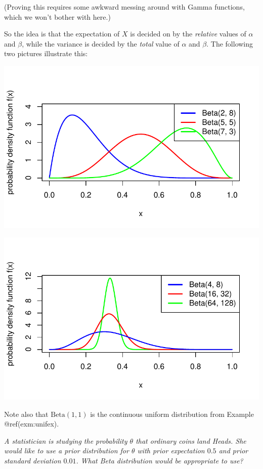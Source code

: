 \documentclass[
  letterpaper,
]{report}
\theoremstyle{definition}
\theoremstyle{definition}
\theoremstyle{remark}
\begin{document}
(Proving this requires some awkward messing around with Gamma functions,
which we won't bother with here.)

So the idea is that the expectation of \(X\) is decided on by the
\emph{relative} values of \(\alpha\) and \(\beta\), while the variance
is decided by the \emph{total} value of \(\alpha\) and \(\beta\). The
following two pictures illustrate this:

\includegraphics{sections/L20-bayes-models_files/figure-pdf/beta-pic-1-1.pdf}

\includegraphics{sections/L20-bayes-models_files/figure-pdf/beta-pic-2-1.pdf}

Note also that \(\text{Beta}(1,1)\) is the continuous uniform
distribution from Example @ref(exm:unifex).

\emph{A statistician is studying the probability \(\theta\) that
ordinary coins land Heads. She would like to use a prior distribution
for \(\theta\) with prior expectation \(0.5\) and prior standard
deviation \(0.01\). What Beta distribution would be appropriate to use?}
\end{document}

